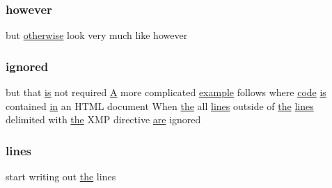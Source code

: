 \subsubsection{\texorpdfstring{however}{however}}
{\footnotesize\ttfamily but \hyperlink{exit_87_8txt_add9358f1f2e831e2906102c98d66905f}{otherwise} look very much like however}

\mbox{\label{ufpp__overview_81_8txt_a41b072d4e414a3fa706019354766d5a8}} 
\subsubsection{\texorpdfstring{ignored}{ignored}}
{\footnotesize\ttfamily but that \hyperlink{intro__blas1_83_8txt_a42a91df93f840595de3019ceb5d1df23}{is} not required \hyperlink{ufpp__overview_81_8txt_a316dd9734f0d687136b27cb10311ed5d}{A} more complicated \hyperlink{option__stopwatch_83_8txt_a234fb06c9989676e2603991316e7ddc3}{example} follows where \hyperlink{ufpp__overview_81_8txt_a74a0615f2d9c4a398d9126096f8092f8}{code} \hyperlink{intro__blas1_83_8txt_a42a91df93f840595de3019ceb5d1df23}{is} contained \hyperlink{M__journal_83_8txt_afce72651d1eed785a2132bee863b2f38}{in} an H\+T\+ML document When \hyperlink{M__stopwatch_83_8txt_a0f266597de2e57eb3aa964927bb30e14}{the} all \hyperlink{ufpp__overview_81_8txt_a38547e77f801e6266edc9bcd56b63a00}{lines} outside of \hyperlink{M__stopwatch_83_8txt_a0f266597de2e57eb3aa964927bb30e14}{the} \hyperlink{ufpp__overview_81_8txt_a38547e77f801e6266edc9bcd56b63a00}{lines} delimited with \hyperlink{M__stopwatch_83_8txt_a0f266597de2e57eb3aa964927bb30e14}{the} X\+MP directive \hyperlink{M__stopwatch_83_8txt_a5040be02b832eba08820289c8a1f81c4}{are} ignored}

\mbox{\label{ufpp__overview_81_8txt_a38547e77f801e6266edc9bcd56b63a00}} 
\subsubsection{\texorpdfstring{lines}{lines}}
{\footnotesize\ttfamily start writing out \hyperlink{M__stopwatch_83_8txt_a0f266597de2e57eb3aa964927bb30e14}{the} lines}

